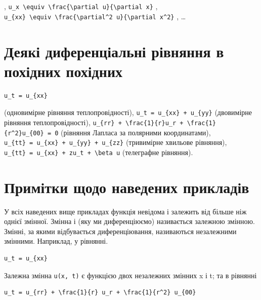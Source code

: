 \documentclass[
  ukrainian,
]{article}
\begin{document}
,
\texttt{u\_x\ \textbackslash{}equiv\ \textbackslash{}frac\{\textbackslash{}partial\ u\}\{\textbackslash{}partial\ x\}}
,
\texttt{u\_\{xx\}\ \textbackslash{}equiv\ \textbackslash{}frac\{\textbackslash{}partial\^{}2\ u\}\{\textbackslash{}partial\ x\^{}2\}}
, \ldots{}

\section{Деякі диференціальні рівняння в похідних
похідних}\label{ux434ux435ux44fux43aux456-ux434ux438ux444ux435ux440ux435ux43dux446ux456ux430ux43bux44cux43dux456-ux440ux456ux432ux43dux44fux43dux43dux44f-ux432-ux43fux43eux445ux456ux434ux43dux438ux445-ux43fux43eux445ux456ux434ux43dux438ux445}

\begin{verbatim}
u_t = u_{xx}
\end{verbatim}

(одновимірне рівняння теплопровідності),
\texttt{u\_t\ =\ u\_\{xx\}\ +\ u\_\{yy\}} (двовимірне рівняння
теплопровідності),
\texttt{u\_\{rr\}\ +\ \textbackslash{}frac\{1\}\{r\}u\_r\ +\ \textbackslash{}frac\{1\}\{r\^{}2\}u\_\{00\}\ =\ 0}
(рівняння Лапласа за полярними координатами),
\texttt{u\_\{tt\}\ =\ u\_\{xx\}\ +\ u\_\{yy\}\ +\ u\_\{zz\}} (тривимірне
хвильове рівняння),
\texttt{u\_\{tt\}\ =\ u\_\{xx\}\ +\ zu\_t\ +\ \textbackslash{}beta\ u}
(телеграфне рівняння).

\section{Примітки щодо наведених
прикладів}\label{ux43fux440ux438ux43cux456ux442ux43aux438-ux449ux43eux434ux43e-ux43dux430ux432ux435ux434ux435ux43dux438ux445-ux43fux440ux438ux43aux43bux430ux434ux456ux432}

У всіх наведених вище прикладах функція невідома і залежить від більше
ніж однієї змінної. Змінна і (яку ми диференціюємо) називається залежною
змінною. Змінні, за якими відбувається диференціювання, називаються
незалежними змінними. Наприклад, у рівнянні.

\begin{verbatim}
u_t = u_{xx}
\end{verbatim}

Залежна змінна \texttt{u(x,\ t)} є функцією двох незалежних змінних x і
t; та в рівнянні

\begin{verbatim}
u_t = u_{rr} + \frac{1}{r} u_r + \frac{1}{r^2} u_{00}
\end{verbatim}
\end{document}
